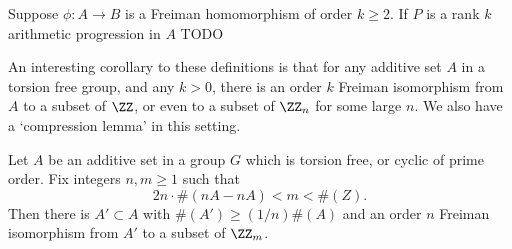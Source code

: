 \begin{theorem}
    Suppose $\phi: A \to B$ is a Freiman homomorphism of order $k \geq 2$. If $P$ is a rank $k$ arithmetic progression in $A$ TODO
\end{theorem}

An interesting corollary to these definitions is that for any additive set $A$ in a torsion free group, and any $k > 0$, there is an order $k$ Freiman isomorphism from $A$ to a subset of $\ZZ$, or even to a subset of $\ZZ_n$ for some large $n$. We also have a `compression lemma' in this setting.

\begin{theorem}
    Let $A$ be an additive set in a group $G$ which is torsion free, or cyclic of prime order. Fix integers $n,m \geq 1$ such that
    \[ 2n \cdot \#(nA - nA) < m < \#(Z). \]
    Then there is $A' \subset A$ with $\#(A') \geq (1/n) \#(A)$ and an order $n$ Freiman isomorphism from $A'$ to a subset of $\ZZ_m$.
\end{theorem}
